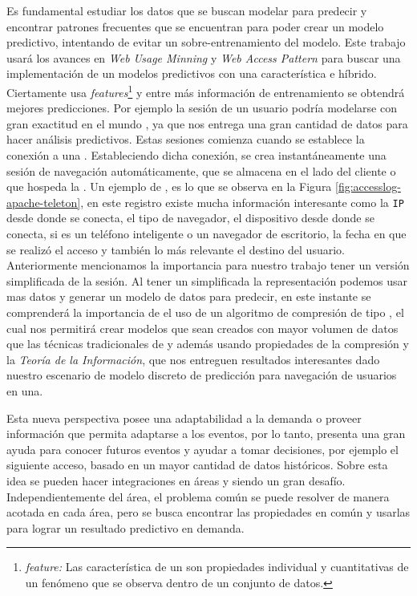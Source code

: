 Es fundamental estudiar los datos que se buscan modelar para predecir y encontrar patrones frecuentes que  se encuentran para poder crear un modelo predictivo, intentando de evitar un sobre-entrenamiento del modelo. Este trabajo usará los avances en \emph{Web Usage Minning} y \emph{Web Access Pattern} para buscar una implementación de un modelos predictivos con una característica \online e híbrido. Ciertamente \machinelearning usa \emph{features}\footnote{\emph{feature:} Las característica de un \machinelearning son propiedades individual y cuantitativas de un fenómeno que se observa dentro de un conjunto de datos.} y entre más información de entrenamiento se obtendrá  mejores predicciones. Por ejemplo la sesión de un usuario podría modelarse con gran exactitud en el mundo \machinelearning, ya que nos entrega una gran cantidad de datos para hacer análisis predictivos. Estas sesiones comienza cuando se establece la conexión a una \www. Estableciendo dicha conexión, se crea instantáneamente una sesión de navegación automáticamente, que se almacena en el lado del cliente o que hospeda la \www. Un ejemplo de  \webasccesslog, es lo que se observa en la Figura \ref{fig:accesslog-apache-teleton}, en este registro existe mucha información interesante como la \texttt{IP} desde donde se conecta, el tipo de navegador, el dispositivo desde donde se conecta, si es un teléfono inteligente o un navegador de escritorio, la fecha en que se realizó el acceso y también lo más relevante el destino del usuario. Anteriormente mencionamos la importancia para nuestro trabajo tener un versión simplificada de la sesión. Al tener un simplificada la representación podemos usar mas datos y generar un modelo de datos para predecir, en este instante se comprenderá la importancia de el uso de un algoritmo de compresión de tipo  \losslessdatacompression, el cual nos permitirá crear modelos que sean creados con mayor volumen de datos que las técnicas tradicionales de \machinelearning y además usando propiedades de la compresión y la \emph{Teoría de la Información}, que nos entreguen resultados interesantes dado nuestro escenario de modelo discreto de predicción para navegación de  usuarios en una.





   
Esta nueva perspectiva posee una adaptabilidad a la demanda o proveer información que permita adaptarse a los eventos, por lo tanto, presenta una gran ayuda para conocer futuros eventos y ayudar a tomar decisiones, por ejemplo el siguiente acceso, basado en un mayor cantidad de datos históricos. Sobre esta idea se pueden hacer integraciones en áreas  \losslessdatacompression y \machinelearning siendo un gran desafío. Independientemente del área, el problema común  se puede resolver de manera acotada en cada área, pero se busca encontrar las propiedades en común y usarlas para lograr un resultado predictivo en demanda.  






